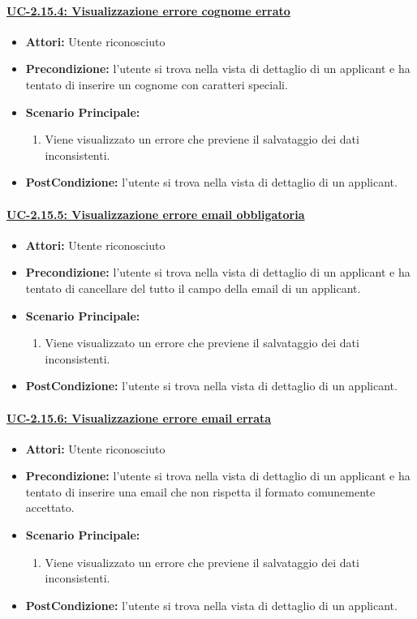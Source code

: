 \paragraph{\underline{UC-2.15.4: Visualizzazione errore cognome errato}}
\begin{itemize}	
	\item \textbf{Attori:} Utente riconosciuto
	\item \textbf{Precondizione:}  l'utente si trova nella vista di dettaglio di un applicant e ha tentato di inserire un cognome con caratteri speciali.
	\item \textbf{Scenario Principale:}
	\begin{enumerate}
		\item Viene visualizzato un errore che previene il salvataggio dei dati inconsistenti.
	\end{enumerate}
	\item \textbf{PostCondizione:} l'utente si trova nella vista di dettaglio di un applicant.
\end{itemize}

\paragraph{\underline{UC-2.15.5: Visualizzazione errore email obbligatoria}}
\begin{itemize}	
	\item \textbf{Attori:} Utente riconosciuto
	\item \textbf{Precondizione:}  l'utente si trova nella vista di dettaglio di un applicant e ha tentato di cancellare del tutto il campo della email di un applicant.
	\item \textbf{Scenario Principale:}
	\begin{enumerate}
		\item Viene visualizzato un errore che previene il salvataggio dei dati inconsistenti.
	\end{enumerate}
	\item \textbf{PostCondizione:} l'utente si trova nella vista di dettaglio di un applicant.
\end{itemize}

\paragraph{\underline{UC-2.15.6: Visualizzazione errore email errata}}
\begin{itemize}	
	\item \textbf{Attori:} Utente riconosciuto
	\item \textbf{Precondizione:}  l'utente si trova nella vista di dettaglio di un applicant e ha tentato di inserire una email che non rispetta il formato comunemente accettato.
	\item \textbf{Scenario Principale:}
	\begin{enumerate}
		\item Viene visualizzato un errore che previene il salvataggio dei dati inconsistenti.
	\end{enumerate}
	\item \textbf{PostCondizione:} l'utente si trova nella vista di dettaglio di un applicant.
\end{itemize}


